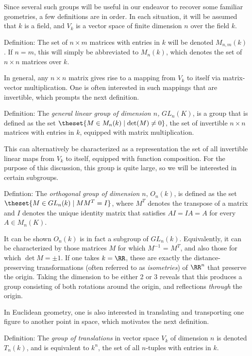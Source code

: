 \documentclass[]{article}
\begin{document}
Since several such groups will be useful in our endeavor to recover some
familiar geometries, a few definitions are in order. In each situation,
it will be assumed that \(k\) is a field, and \(V_k\) is a vector space
of finite dimension \(n\) over the field \(k\).

Definition: The set of \(n\times m\) matrices with entries in \(k\) will
be denoted \(M_{n,m}(k)\). If \(n=m\), this will simply be abbreviated
to \(M_n(k)\), which denotes the set of \(n\times n\) matrices over
\(k\).

In general, any \(n\times n\) matrix gives rise to a mapping from
\(V_k\) to itself via matrix-vector multiplication. One is often
interested in such mappings that are invertible, which prompts the next
definition.

Definition: The \emph{general linear group of dimension \(n\),}
\(GL_n(K)\), is a group that is defined as the set
\(\theset{M \in M_n(k) \mid \det (M) \neq 0}\), the set of invertible
\(n\times n\) matrices with entries in \(k\), equipped with matrix
multiplication.

This can alternatively be characterized as a representation the set of
all invertible linear maps from \(V_k\) to itself, equipped with
function composition. For the purpose of this discussion, this group is
quite large, so we will be interested in certain subgroups.

Defintion: The \emph{orthogonal group of dimension \(n\)}, \(O_n(k)\),
is defined as the set \(\theset{M \in GL_n(k) \mid MM^T = I}\), where
\(M^T\) denotes the transpose of a matrix and \(I\) denotes the unique
identity matrix that satisfies \(AI = IA = A\) for every
\(A\in M_n(K)\).

It can be shown \(O_n(k)\) is in fact a subgroup of \(GL_n(k)\).
Equivalently, it can be characterized by those matrices \(M\) for which
\(M^{-1}\) = \(M^T\), and also those for which \(\det M = \pm 1\). If
one takes \(k=\RR\), these are exactly the distance-preserving
transformations (often referred to as \emph{isometries}) of \(\RR^n\)
that preserve the origin. Taking the dimension to be either 2 or 3
reveals that this produces a group consisting of both rotations around
the origin, and reflections \emph{through} the origin.

In Euclidean geometry, one is also interested in translating and
transporting one figure to another point in space, which motivates the
next definition.

Definition: The \emph{group of translations} in vector space \(V_k\) of
dimension \(n\) is denoted \(T_n(k)\), and is equivalent to \(k^n\), the
set of all \(n\)-tuples with entries in \(k\).
\end{document}
